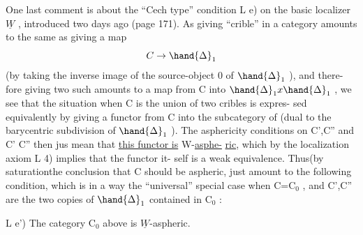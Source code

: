 One last comment is about the ``\hand{\v{}}Cech type'' condition L e) on the
basic localizer $\underline{W}$ , introduced  two days ago (page 171). As 
giving\hand{|} ``crible'' in a category amounts to the same as giving a map
\[ C \to \hand{\Delta}_1 \]
(by taking the inverse image of the source-object \hand{\{}0\hand{\}} of $\hand{\Delta}_1$ ), and there-%
fore giving two such amounts to a map from C into $\hand{\Delta}_1 x \hand{\Delta}_1$ , we see that
the  situation when C is the union of two cribles is  expres-%
sed  equivalently by giving a functor from C into the subcategory
\diagram{\[ C_0 = \hand{\Biggl(} \begin{tikzcd}[row sep=small] & b \\ a \arrow[ur] \arrow[dr] & \\ & c \end{tikzcd} \hand{\Biggr)} \]}
of (dual to the barycentric subdivision of $\hand{\Delta}_1$ ). The asphericity
conditions on C',C'' and C' C'' then jus mean that \uline{this functor is} W-\uline{asphe-}%
\uline{ric}, which by the localization axiom L 4) implies that the functor it-%
self is a weak equivalence. Thus(by saturation\hand{)}the conclusion that C
should be aspheric, just amount to the following condition, which is
in a way the ``universal'' special case when C=C$_0$ , and C',C'' are the
two copies of $\hand{\Delta}_1$ contained in C$_0$ :

L e') The category C$_0$ above is $\underline{W}$-aspheric.

